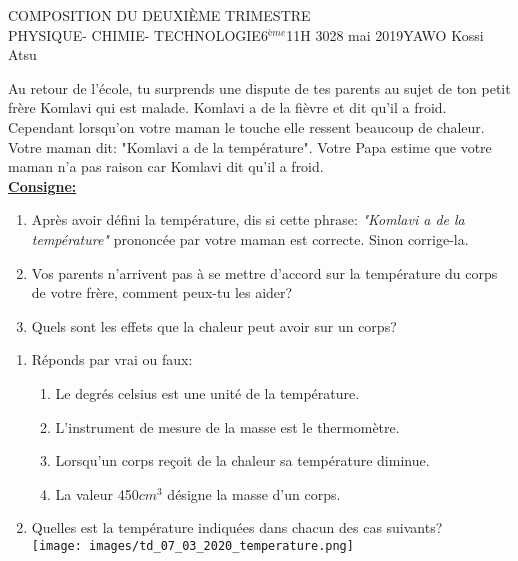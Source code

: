 \documentclass[12pt,a4paper]{book}
\newcommand{\prof}{YAWO Kossi Atsu}
\newcommand{\matiere}{\\PHYSIQUE- CHIMIE- TECHNOLOGIE}
\newcommand{\classe}{6$^{ème}$}
\begin{document}
\begin{devoir}{COMPOSITION DU DEUXIÈME TRIMESTRE}{\matiere}{\classe}{1}{1H 30}{28 mai 2019}{\prof}
\begin{exo}[6]
Au retour de l'école, tu surprends une dispute de tes parents au sujet de ton petit frère Komlavi qui est malade. Komlavi a de la fièvre et dit qu'il a froid. Cependant lorsqu'on votre maman le touche elle ressent beaucoup de chaleur. Votre maman dit: "Komlavi a de la température". Votre Papa estime que votre maman n'a pas raison car Komlavi dit qu'il a froid.\\

\textbf{\underline{Consigne:}}
\begin{enumerate}
\item Après avoir défini la température, dis si cette phrase: \emph{"Komlavi a de la température"} prononcée par votre maman est correcte. Sinon corrige-la.
\item Vos parents n'arrivent pas à se mettre d'accord sur la température du corps de votre frère, comment peux-tu les aider?
\item Quels sont les effets que la chaleur peut avoir sur un corps?
\end{enumerate}
\end{exo}

\vspace{0.2cm}

\begin{exo}[4]
\setlength{\columnseprule}{1pt}
\begin{multicols}{2}
\begin{enumerate}
\item Réponds par vrai ou faux:
\begin{enumerate}
\item Le degrés celsius est une unité de la température.
\item L'instrument de mesure de la masse est le thermomètre.
\item Lorsqu'un corps reçoit de la chaleur sa température diminue.
\item La valeur 450$cm^3$ désigne la masse d'un corps.\\
\end{enumerate}
\item Quelles est la température indiquées dans chacun des cas suivants?\\
\texttt{[image: images/td\_07\_03\_2020\_temperature.png]}
\end{enumerate}
\end{multicols}
\end{exo}


\end{devoir}
\end{document}
